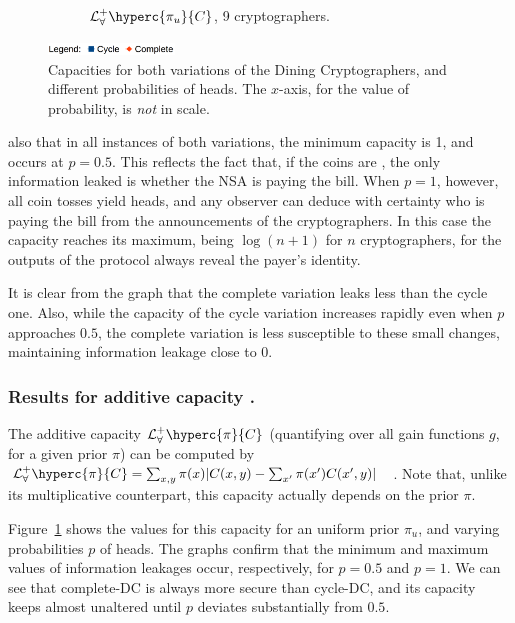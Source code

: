 \begin{figure}[ht]
\begin{subfigure}[b]{0.45\linewidth}
\caption{$\mathcal{L}^+_\forall\hyperc{\pi_u}{C}$, 9 cryptographers.}
\end{subfigure}
\includegraphics[width=0.3\textwidth]{figures/dining-legend.png}
\caption{Capacities for both variations of the Dining Cryptographers,
and different probabilities of heads.
The $x$-axis, for the value of probability, is \emph{not} in scale.}
\label{figure:dingraph}
\end{figure}

 also that in all instances of both variations, 
the minimum capacity is 1, and occurs at $p=0.5$.
This reflects the fact that, if the coins are , the only information 
leaked is whether the NSA is paying the bill.
When $p=1$, however, all coin tosses yield heads, and any observer 
can deduce with certainty who is paying the bill from the announcements 
of the cryptographers. 
In this case the capacity reaches its maximum, being $\log (n+1)$ for 
$n$ cryptographers, for the outputs of the protocol always reveal 
the payer's identity.


It is clear from the graph that the complete variation leaks less than the cycle one. 
Also, while the capacity of the cycle variation increases rapidly even when $p$ approaches
$0.5$, the complete variation is less susceptible to these small changes, 
maintaining information leakage close to 0.

\subsubsection{Results for additive capacity%
.}
The additive capacity $\mathcal{L}^+_\forall\hyperc{\pi}{C}$ (quantifying
over all gain functions $g$, for a given prior $\pi$) can be
computed by
$ 
\mathcal{L}^+_\forall\hyperc{\pi}{C}=\sum_{x,y} \pi(x) |C(x,y) - \sum_{x'}\pi(x')C(x',y)|
$
~\cite{addmult}.
Note that, unlike its multiplicative counterpart, this capacity actually depends on 
the prior $\pi$. 

Figure~\ref{figure:dingraph} shows the values for this capacity for an uniform prior $\pi_u$, 
and varying probabilities $p$ of heads. 
The graphs confirm that the minimum and maximum values of information leakages occur, 
respectively, for $p=0.5$ and $p=1$.
We can see that complete-DC is always more secure than cycle-DC,
and its capacity keeps almost unaltered until $p$ deviates substantially from $0.5$.

